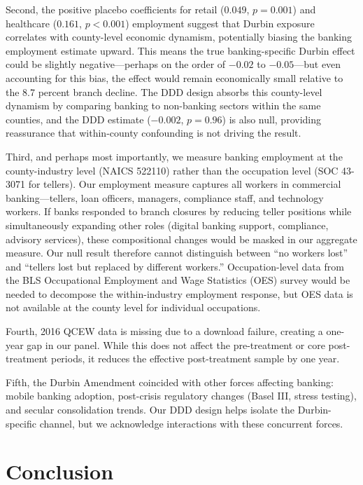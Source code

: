 \documentclass[12pt]{article}
\begin{document}
Second, the positive placebo coefficients for retail ($0.049$, $p = 0.001$) and healthcare ($0.161$, $p < 0.001$) employment suggest that Durbin exposure correlates with county-level economic dynamism, potentially biasing the banking employment estimate upward. This means the true banking-specific Durbin effect could be slightly negative---perhaps on the order of $-0.02$ to $-0.05$---but even accounting for this bias, the effect would remain economically small relative to the 8.7 percent branch decline. The DDD design absorbs this county-level dynamism by comparing banking to non-banking sectors within the same counties, and the DDD estimate ($-0.002$, $p = 0.96$) is also null, providing reassurance that within-county confounding is not driving the result.

Third, and perhaps most importantly, we measure banking employment at the county-industry level (NAICS 522110) rather than the occupation level (SOC 43-3071 for tellers). Our employment measure captures all workers in commercial banking---tellers, loan officers, managers, compliance staff, and technology workers. If banks responded to branch closures by reducing teller positions while simultaneously expanding other roles (digital banking support, compliance, advisory services), these compositional changes would be masked in our aggregate measure. Our null result therefore cannot distinguish between ``no workers lost'' and ``tellers lost but replaced by different workers.'' Occupation-level data from the BLS Occupational Employment and Wage Statistics (OES) survey would be needed to decompose the within-industry employment response, but OES data is not available at the county level for individual occupations.

Fourth, 2016 QCEW data is missing due to a download failure, creating a one-year gap in our panel. While this does not affect the pre-treatment or core post-treatment periods, it reduces the effective post-treatment sample by one year.

Fifth, the Durbin Amendment coincided with other forces affecting banking: mobile banking adoption, post-crisis regulatory changes (Basel III, stress testing), and secular consolidation trends. Our DDD design helps isolate the Durbin-specific channel, but we acknowledge interactions with these concurrent forces.


\section{Conclusion}\label{sec:conclusion}
\end{document}

